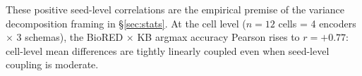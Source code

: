 These positive seed-level correlations are the empirical premise of
the variance decomposition framing in \S\ref{sec:stats}. At the cell level
($n = 12$ cells = 4 encoders $\times$ 3 schemas), the BioRED $\times$
KB argmax accuracy Pearson rises to $r = +0.77$: cell-level mean differences
are tightly linearly coupled even when seed-level coupling is moderate.